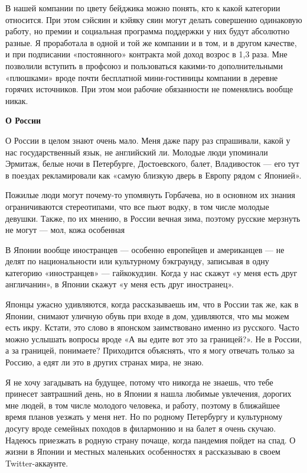 В нашей компании по цвету бейджика можно понять, кто к какой категории относится. При этом сэйсяин и кэйяку сяин могут делать совершенно одинаковую работу, но премии и социальная программа поддержки у них будут абсолютно разные. Я проработала в одной и той же компании и в том, и в другом качестве, и при подписании «постоянного» контракта мой доход возрос в 1,3 раза. Мне позволили вступить в профсоюз и пользоваться какими-то дополнительными «плюшками» вроде почти бесплатной мини-гостиницы компании в деревне горячих источников. При этом мои рабочие обязанности не поменялись вообще никак.

\textbf{О России}

О России в целом знают очень мало. Меня даже пару раз спрашивали, какой у нас государственный язык, не английский ли. Молодые люди упоминали Эрмитаж, белые ночи в Петербурге, Достоевского, балет, Владивосток — его тут в поездах рекламировали как «самую близкую дверь в Европу рядом с Японией».

\begin{fancyquotes}
    Пожилые люди могут почему-то упомянуть Горбачева, но в основном их знания ограничиваются стереотипами, что все пьют водку, в том числе молодые девушки. Также, по их мнению, в России вечная зима, поэтому русские мерзнуть не могут — мол, кожа особенная
\end{fancyquotes}

В Японии вообще иностранцев — особенно европейцев и американцев — не делят по национальности или культурному бэкграунду, записывая в одну категорию «иностранцев» — гайкокудзин. Когда у нас скажут «у меня есть друг англичанин», в Японии скажут «у меня есть друг иностранец».

Японцы ужасно удивляются, когда рассказываешь им, что в России так же, как в Японии, снимают уличную обувь при входе в дом, удивляются, что мы можем есть икру. Кстати, это слово в японском заимствовано именно из русского. Часто можно услышать вопросы вроде «А вы едите вот это за границей?». Не в России, а за границей, понимаете? Приходится объяснять, что я могу отвечать только за Россию, а едят ли это в других странах мира, не знаю.

Я не хочу загадывать на будущее, потому что никогда не знаешь, что тебе принесет завтрашний день, но в Японии я нашла любимые увлечения, дорогих мне людей, в том числе молодого человека, и работу, поэтому в ближайшее время планов уезжать у меня нет. Но по родному Петербургу и культурному досугу вроде семейных походов в филармонию и на балет я очень скучаю. Надеюсь приезжать в родную страну почаще, когда пандемия пойдет на спад. О жизни в Японии и местных маленьких особенностях я рассказываю в своем Twitter-аккаунте.

